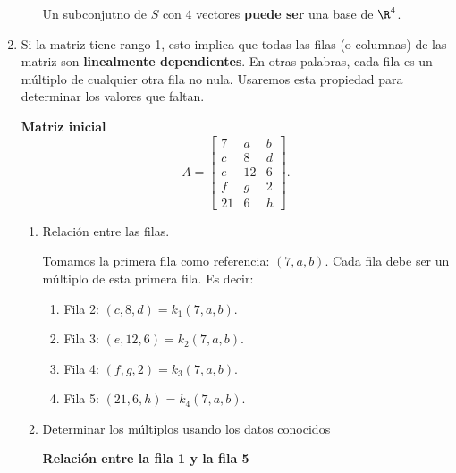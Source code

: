 \begin{enumerate}[label=\color{red}\textbf{\arabic*)}]
\begin{enumerate}[label=\color{red}\textbf{\alph*)}]
                Un subconjutno de $S$ con 4 vectores  \textbf{puede ser} una base de $\R^4$. 
        \end{enumerate}
    \item {}

    Si la matriz tiene rango 1, esto implica que todas las filas (o columnas) de las matriz son \textbf{linealmente dependientes}. En otras palabras, cada fila es un múltiplo de cualquier otra fila no nula. Usaremos esta propiedad para determinar los valores que faltan.

    \textbf{Matriz inicial}
    \[
    A=\begin{bmatrix} 
        7 & a & b \\
        c & 8 & d \\
        e & 12 & 6 \\
        f & g & 2\\
        21 & 6 & h
    \end{bmatrix} .
    \] 
    \begin{enumerate}[label=Paso \arabic*:]
        \item Relación entre las filas.

            Tomamos la primera fila como referencia: $(7,a,b)$. Cada fila debe ser un múltiplo de esta primera fila. Es decir:
             \begin{enumerate}[label=\arabic*)]
                \item Fila 2: $(c,8,d)=k_1(7,a,b)$.
                \item Fila 3: $(e,12,6)=k_2(7,a,b)$.
                \item Fila 4: $(f,g,2)=k_3(7,a,b)$.
                \item Fila 5: $(21,6,h)=k_4(7,a,b)$.
            \end{enumerate}
        \item Determinar los múltiplos usando los datos conocidos

            \textbf{Relación entre la fila 1 y la fila 5}


\end{enumerate}
\end{enumerate}
